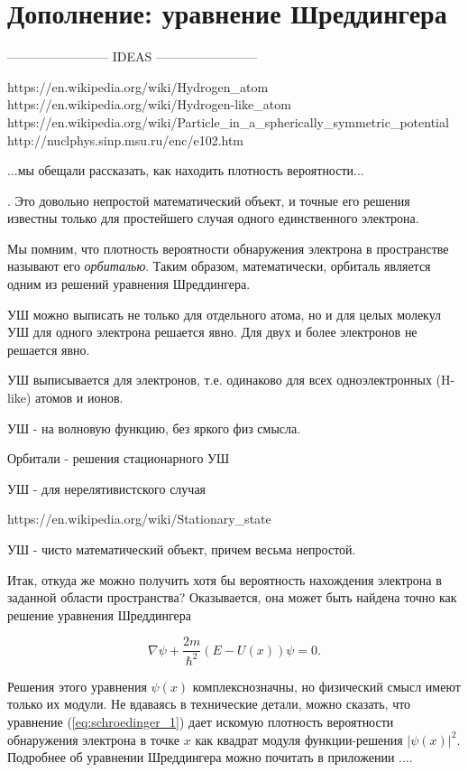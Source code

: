 \chapter{Дополнение: уравнение Шреддингера}\label{ch:schroedinger_eq}


------------------------ IDEAS ------------------------ 


https://en.wikipedia.org/wiki/Hydrogen_atom
https://en.wikipedia.org/wiki/Hydrogen-like_atom
https://en.wikipedia.org/wiki/Particle_in_a_spherically_symmetric_potential
http://nuclphys.sinp.msu.ru/enc/e102.htm



...мы обещали рассказать, как находить плотность вероятности...

.
Это довольно непростой математический объект, и точные его решения известны только для простейшего случая одного единственного электрона.
 
Мы помним, что плотность вероятности обнаружения электрона в пространстве называют его \textit{орбиталью}.
Таким образом, математически, орбиталь является одним из решений уравнения Шреддингера.



УШ можно выписать не только для отдельного атома, но и для целых молекул
УШ для одного электрона решается явно.
Для двух и более электронов не решается явно.

УШ выписывается для электронов, т.е. одинаково для всех одноэлектронных (H-like) атомов и ионов.

УШ - на волновую функцию, без яркого физ смысла.

Орбитали - решения стационарного УШ

УШ - для нерелятивистского случая

https://en.wikipedia.org/wiki/Stationary_state


УШ - чисто математический объект, причем весьма непростой.

Итак, откуда же можно получить хотя бы вероятность нахождения электрона в заданной области пространства?
Оказывается, она может быть найдена точно как решение уравнения Шреддингера

\begin{equation}\label{eq:schroedinger_1}
\nabla\psi + \frac{2m}{\hbar^2}(E - U(x))\psi = 0.
\end{equation}

Решения этого уравнения $\psi(x)$ комплекснозначны, но физический смысл имеют только их модули. 
Не вдаваясь в технические детали, можно сказать, что уравнение (\ref{eq:schroedinger_1}) дает искомую плотность вероятности обнаружения электрона в точке $x$ как квадрат модуля функции-решения $|\psi(x)|^2$.
Подробнее об уравнении Шреддингера можно почитать в приложении ....
